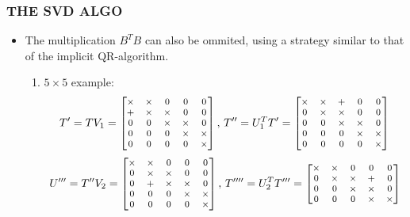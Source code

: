 \documentclass[a4paper,8pt]{beamer} %
\newcommand{\smatrix}[1]{\left[\begin{matrix} #1 \end{matrix}\right]}
\begin{document}
\begin{frame}%
	\frametitle{THE SVD ALGO}
	\begin{itemize}
		\item <1->  The multiplication $B^TB$ can also be ommited, using a strategy similar to that of the implicit QR-algorithm.
			\begin{enumerate}
				\item $5\times 5$ example:
					\begin{equation}
						\begin{footnotesize}
							T'= T V_1= 
							\smatrix
							{
								\times 	& \times & 0 & 0 & 0   \\
								+ 	& \times & \times & 0 & 0   \\
								0 & 0 & \times & \times & 0   \\
								0 & 0 & 0 & \times & \times     \\
								0 & 0 & 0 & 0 & \times    \\
							}
							,\,
							T''=  U_1^T T'  = 
							\smatrix
							{
								\times 	& \times & + & 0 & 0   \\
								0	& \times & \times & 0 & 0   \\
								0 	& 0 & \times & \times & 0    \\
								0 & 0 & 0 & \times & \times   \\
								0 & 0 & 0 & 0 & \times  \\
							}
						\end{footnotesize}
					\end{equation}
					\begin{equation}
						\begin{footnotesize}
							U'''= T'' V_2 = 
							\smatrix
							{
								\times 	& \times & 0 & 0 & 0   \\
								0 	& \times & \times & 0 & 0   \\
								0 	& + & \times & \times & 0\\
								0 & 0 & 0 & \times & \times   \\
								0 & 0 & 0 & 0 & \times  \\
							}
							,\,
							T''''= U_2^TT'''= 
							\smatrix
							{
								\times 	& \times & 0 & 0 & 0   \\
								0 	& \times & \times & + & 0   \\
								0 	& 0 & \times & \times & 0    \\
								0 & 0 & 0 & \times & \times   \\
}
\end{footnotesize}
\end{equation}
\end{enumerate}
\end{itemize}
\end{frame}
\end{document}
